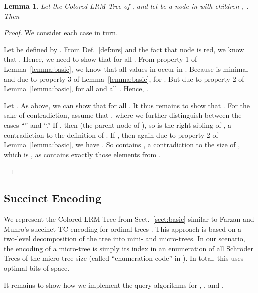 \documentclass[11pt,onecolumn,final]{article} \usepackage{a4}
\theoremstyle{plain}
\newtheorem{lemma}[definition]{Lemma}
\theoremstyle{remark}
\begin{document}
\begin{lemma}
  \label{lemma:nsv}
  Let  the Colored LRM-Tree of , and let  be a node in  with children , . Then
  
\end{lemma}
\begin{proof}
  We consider each case in turn.
  \begin{description}[\setlabelstyle{\normalfont}]
  \item[.]
    Let  be defined by . From Def.~\ref{def:nrs} and the fact that node  is red, we know that . Hence, we need to show that  for all . From property 1 of Lemma~\ref{lemma:basic}, we know that all values in  occur in . Because  is minimal and due to property 3 of Lemma~\ref{lemma:basic},  for . But due to property 2 of Lemma~\ref{lemma:basic},  for all  and all . Hence, .
  \item[.]
    Let . As above, we can show that  for all . It thus remains to show that . For the sake of contradiction, assume that , where we further distinguish between the cases ``'' and ``.'' If , then  (the parent node of ), so  is the right sibling of , a contradiction to the definition of . If , then again due to property 2 of Lemma~\ref{lemma:basic}, we have . So  contains , a contradiction to the size of , which is , as  contains exactly those elements from .
  \end{description}
\end{proof}

\subsection{Succinct Encoding}
\label{sect:succinct}
We represent the Colored LRM-Tree  from Sect.~\ref{sect:basic} similar to Farzan and Munro's succinct TC-encoding for ordinal trees \cite{farzan08uniform}. This approach is based on a two-level decomposition of the tree into mini- and micro-trees. In our scenario, the encoding of a micro-tree is simply its index in an enumeration of all Schr\"oder Trees of the micro-tree size (called ``enumeration code'' in \cite{farzan08uniform}). In total, this uses optimal  bits of space.

It remains to show how we implement the query algorithms for , , and .
\end{document}
